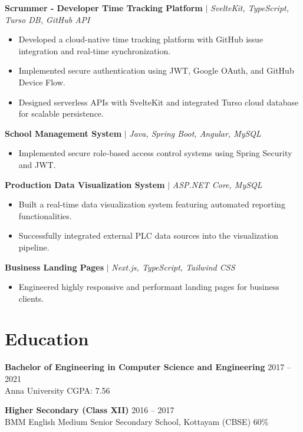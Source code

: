 \documentclass[10pt, letterpaper]{article}
\begin{document}
\textbf{Scrummer - Developer Time Tracking Platform} $|$ \textit{SvelteKit, TypeScript, Turso DB, GitHub API}
\begin{itemize}[leftmargin=0.25in, itemsep=0pt, parsep=0pt, topsep=2pt]
    \item Developed a cloud-native time tracking platform with GitHub issue integration and real-time synchronization.
    \item Implemented secure authentication using JWT, Google OAuth, and GitHub Device Flow.
    \item Designed serverless APIs with SvelteKit and integrated Turso cloud database for scalable persistence.
\end{itemize}
\textbf{School Management System} $|$ \textit{Java, Spring Boot, Angular, MySQL}
\begin{itemize}[leftmargin=0.25in, itemsep=0pt, parsep=0pt, topsep=2pt]
    \item Implemented secure role-based access control systems using Spring Security and JWT.
\end{itemize}

\textbf{Production Data Visualization System} $|$ \textit{ASP.NET Core, MySQL}
\begin{itemize}[leftmargin=0.25in, itemsep=0pt, parsep=0pt, topsep=2pt]
    \item Built a real-time data visualization system featuring automated reporting functionalities.
    \item Successfully integrated external PLC data sources into the visualization pipeline.
\end{itemize}

\textbf{Business Landing Pages} $|$ \textit{Next.js, TypeScript, Tailwind CSS}
\begin{itemize}[leftmargin=0.25in, itemsep=0pt, parsep=0pt, topsep=2pt]
    \item Engineered highly responsive and performant landing pages for business clients.
\end{itemize}

\section*{Education}
\textbf{Bachelor of Engineering in Computer Science and Engineering} \hfill 2017 -- 2021 \\
Anna University \hfill CGPA: 7.56

\textbf{Higher Secondary (Class XII)} \hfill 2016 -- 2017 \\
BMM English Medium Senior Secondary School, Kottayam (CBSE) \hfill 60\%
\end{document}
